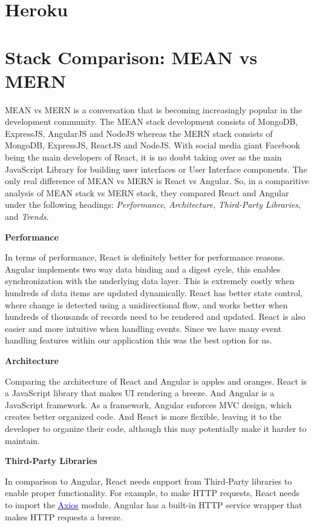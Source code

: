 \section{Heroku}

\section{Stack Comparison: MEAN vs MERN}

MEAN vs MERN is a conversation that is becoming increasingly popular in the development community. The MEAN stack development consists of MongoDB, ExpressJS, AngularJS and NodeJS whereas the MERN stack consists of MongoDB, ExpressJS, ReactJS and NodeJS. With social media giant Facebook being the main developers of React, it is no doubt taking over as the main JavaScript Library for building user interfaces or User Interface components. The only real difference of MEAN vs MERN is React vs Angular. So, in a comparitive analysis \cite{aggarwal2018comparative} of MEAN stack vs MERN stack, they compared React and Angular under the following headings: \textit{Performance}, \textit{Architecture}, \textit{Third-Party Libraries}, and \textit{Trends}. 

\textbf{Performance}

In terms of performance, React is definitely better for performance reasons. Angular implements two way data binding and a digest cycle, this enables synchronization with the underlying data layer. This is extremely costly when hundreds of data items are updated dynamically. React has better state control, where change is detected using a unidirectional flow, and works better when hundreds of thousands of records need to be rendered and updated. React is also easier and more intuitive when handling events. Since we have many event handling features within our application this was the best option for us.

\textbf{Architecture}

Comparing the architecture of React and Angular is apples and oranges. React is a JavaScript library that makes UI rendering a breeze. And Angular is a JavaScript framework. As a framework, Angular enforces MVC design, which creates better organized code. And React is more flexible, leaving it to the developer to organize their code, although this may potentially make it harder to maintain.

\textbf{Third-Party Libraries}

In comparison to Angular, React needs support from Third-Party libraries to enable proper functionality. For example, to make HTTP requests, React needs to import the \href{https://github.com/axios/axios}{\textcolor{blue}{Axios}} module. Angular has a built-in HTTP service wrapper that makes HTTP requests a breeze.

